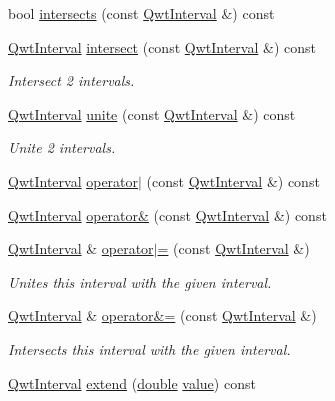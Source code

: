 \begin{DoxyCompactItemize}
\item 
bool \hyperlink{class_qwt_interval_a46a768a591a9a600f9885bd15a60da5b}{intersects} (const \hyperlink{class_qwt_interval}{Qwt\-Interval} \&) const 
\item 
\hyperlink{class_qwt_interval}{Qwt\-Interval} \hyperlink{class_qwt_interval_aa4df23450ffa012e1fedd13509402483}{intersect} (const \hyperlink{class_qwt_interval}{Qwt\-Interval} \&) const 
\begin{DoxyCompactList}\small\item\em Intersect 2 intervals. \end{DoxyCompactList}\item 
\hyperlink{class_qwt_interval}{Qwt\-Interval} \hyperlink{class_qwt_interval_ade8626dc4c9521e05ce7fc51cb58d730}{unite} (const \hyperlink{class_qwt_interval}{Qwt\-Interval} \&) const 
\begin{DoxyCompactList}\small\item\em Unite 2 intervals. \end{DoxyCompactList}\item 
\hyperlink{class_qwt_interval}{Qwt\-Interval} \hyperlink{class_qwt_interval_ac6c5c7837821811f8b0748c529f137a6}{operator$|$} (const \hyperlink{class_qwt_interval}{Qwt\-Interval} \&) const 
\item 
\hyperlink{class_qwt_interval}{Qwt\-Interval} \hyperlink{class_qwt_interval_a87091a809fb14d2321240be47bb9cbe1}{operator\&} (const \hyperlink{class_qwt_interval}{Qwt\-Interval} \&) const 
\item 
\hyperlink{class_qwt_interval}{Qwt\-Interval} \& \hyperlink{class_qwt_interval_a980e6449437b689893bd8ec7370e91e0}{operator$|$=} (const \hyperlink{class_qwt_interval}{Qwt\-Interval} \&)
\begin{DoxyCompactList}\small\item\em Unites this interval with the given interval. \end{DoxyCompactList}\item 
\hyperlink{class_qwt_interval}{Qwt\-Interval} \& \hyperlink{class_qwt_interval_a31b75687b9d2e1931ec82f61cc644222}{operator\&=} (const \hyperlink{class_qwt_interval}{Qwt\-Interval} \&)
\begin{DoxyCompactList}\small\item\em Intersects this interval with the given interval. \end{DoxyCompactList}\item 
\hyperlink{class_qwt_interval}{Qwt\-Interval} \hyperlink{class_qwt_interval_a484665e4af4ea42583b3224c10d1d9c3}{extend} (\hyperlink{_super_l_u_support_8h_a8956b2b9f49bf918deed98379d159ca7}{double} \hyperlink{glext_8h_aa0e2e9cea7f208d28acda0480144beb0}{value}) const 

\end{DoxyCompactItemize}
